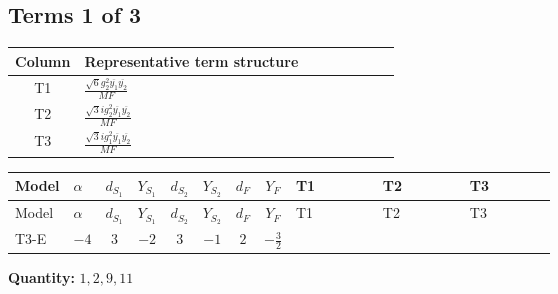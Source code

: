 \documentclass[8pt]{article}
\begin{document}
\begin{landscape}
\subsection*{Terms 1 of 3}
\begin{center}
\begin{tabular}{@{}c >{\raggedright\arraybackslash}p{0.82\linewidth}@{}}
\toprule
Column & Representative term structure \\
\midrule
T1 & \(\displaystyle \frac{\sqrt{6} g_{2}^{2} \overline{y_{1}} \overline{y_{2}}}{MF}\) \\
\midrule
T2 & \(\displaystyle \frac{\sqrt{3} i g_{2}^{2} \overline{y_{1}} \overline{y_{2}}}{MF}\) \\
\midrule
T3 & \(\displaystyle \frac{\sqrt{3} i g_{1}^{2} \overline{y_{1}} \overline{y_{2}}}{MF}\) \\
\midrule
\bottomrule
\end{tabular}
\end{center}
\smallskip
\tiny
\begin{longtable}{@{}llcccccc >{\raggedright\arraybackslash}p{0.21\linewidth} >{\raggedright\arraybackslash}p{0.21\linewidth} >{\raggedright\arraybackslash}p{0.21\linewidth}@{}}
\toprule
Model & $\alpha$ & $d_{S_1}$ & $Y_{S_1}$ & $d_{S_2}$ & $Y_{S_2}$ & $d_F$ & $Y_F$ & T1 & T2 & T3 \\
\midrule
\endfirsthead
\toprule
Model & $\alpha$ & $d_{S_1}$ & $Y_{S_1}$ & $d_{S_2}$ & $Y_{S_2}$ & $d_F$ & $Y_F$ & T1 & T2 & T3 \\
\midrule
\endhead
T3-E & $-4$ & $3$ & $-2$ & $3$ & $-1$ & $2$ & $-\frac{3}{2}$ & \scriptsize\adjustbox{max width=\linewidth}{$\begin{gathered} - \frac{\sqrt{6} g_{2}^{2} \overline{y_{1}} \overline{y_{2}}}{6 MF}\end{gathered}$} & \scriptsize\adjustbox{max width=\linewidth}{$\begin{gathered} - \frac{15 \sqrt{3} i g_{2}^{2} \overline{y_{1}} \overline{y_{2}}}{8 MF}\end{gathered}$} & \scriptsize\adjustbox{max width=\linewidth}{$\begin{gathered} - \frac{9 \sqrt{3} i g_{1}^{2} \overline{y_{1}} \overline{y_{2}}}{8 MF}\end{gathered}$} \\
\midrule
\bottomrule
\end{longtable}
\clearpage
\noindent\textbf{Quantity: }$\mathrm{1,2,9,11}$\par\smallskip

\end{landscape}
\end{document}
